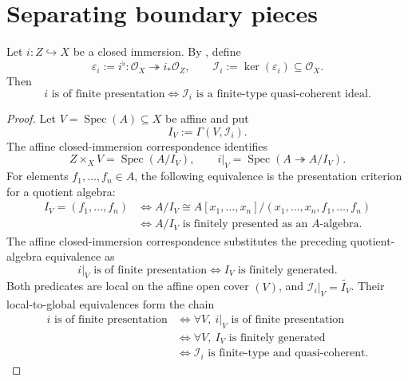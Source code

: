 \section{Separating boundary pieces}

\begin{lemma}
  \label{lemma:nagata-closed-fp-ideal-finite-type}
  \lean{}

  Let $i\colon Z\hookrightarrow X$ be a closed immersion.  By
  , define
  \[
    \varepsilon_i:=i^\flat\colon
      \mathcal O_X\twoheadrightarrow i_*\mathcal O_Z,
    \qquad
    \mathcal I_i:=\ker(\varepsilon_i)
      \subseteq\mathcal O_X.
  \]
  Then
  \[
    i\text{ is of finite presentation}
      \Longleftrightarrow
    \mathcal I_i\text{ is a finite-type quasi-coherent ideal}.
  \]
\end{lemma}

\begin{proof}
  Let $V=\operatorname{Spec}(A)\subseteq X$ be affine and put
  \[
    I_V:=\Gamma(V,\mathcal I_i).
  \]
  The affine closed-immersion correspondence identifies
  \[
    Z\times_XV=\operatorname{Spec}(A/I_V),
    \qquad
    i|_V=\operatorname{Spec}(A\twoheadrightarrow A/I_V).
  \]
  For elements $f_1,\ldots,f_n\in A$, the following equivalence is the
  presentation criterion for a quotient algebra:
  \[
  \begin{aligned}
    I_V=(f_1,\ldots,f_n)
      &\Longleftrightarrow
        A/I_V\cong
        A[x_1,\ldots,x_n]/(x_1,\ldots,x_n,f_1,\ldots,f_n)\\
      &\Longleftrightarrow
        A/I_V\text{ is finitely presented as an }A\text{-algebra}.
  \end{aligned}
  \]
  The affine closed-immersion correspondence substitutes the preceding
  quotient-algebra equivalence as
  \[
    i|_V\text{ is of finite presentation}
      \Longleftrightarrow I_V\text{ is finitely generated}.
  \]
  Both predicates are local on the affine open cover $(V)$, and
  $\mathcal I_i|_V=\widetilde{I_V}$.  Their local-to-global equivalences form
  the chain
  \[
  \begin{aligned}
    i\text{ is of finite presentation}
      &\Longleftrightarrow
        \forall V,\ i|_V\text{ is of finite presentation}\\
      &\Longleftrightarrow
        \forall V,\ I_V\text{ is finitely generated}\\
      &\Longleftrightarrow
        \mathcal I_i\text{ is finite-type and quasi-coherent}.
  \end{aligned}
  \]
\end{proof}

